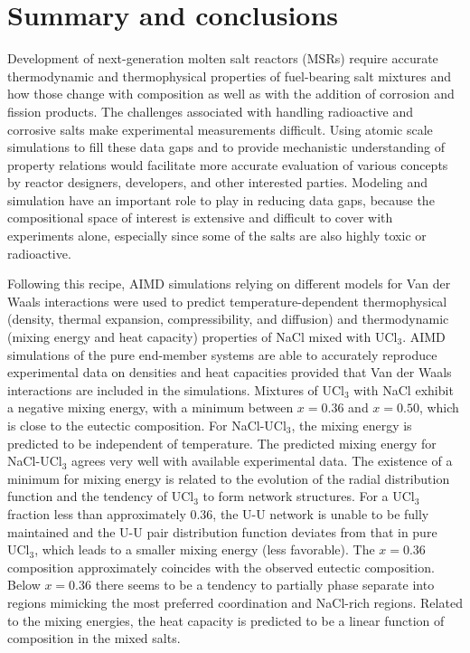 \documentclass[preprint,3p,10pt,onecolumn,number,sort&compress]{elsarticle}
\begin{document}
{\FloatBarrier

\section{Summary and conclusions}
\label{sec:conclusions}
Development of next-generation molten salt reactors (MSRs) require accurate thermodynamic and thermophysical properties of fuel-bearing salt mixtures and how those change with composition as well as with the addition of corrosion and fission products. The challenges associated with handling radioactive and corrosive salts make experimental measurements difficult. Using atomic scale simulations to fill these data gaps and to provide mechanistic understanding of property relations would facilitate more accurate evaluation of various concepts by reactor designers, developers, and other interested parties. Modeling and simulation have an important role to play in reducing data gaps, because the compositional space of interest is extensive and difficult to cover with experiments alone, especially since some of the salts are also highly toxic or radioactive. 

Following this recipe, AIMD simulations relying on different models for Van der Waals interactions were used to predict temperature-dependent thermophysical (density, thermal expansion, compressibility, and diffusion) and thermodynamic (mixing energy and heat capacity) properties of NaCl mixed with UCl$_3$. AIMD simulations of the pure end-member systems are able to accurately reproduce experimental data on densities and heat capacities provided that Van der Waals interactions are included in the simulations. %
Mixtures of UCl$_3$ with NaCl exhibit a negative mixing energy, with a minimum between $x=0.36$ and $x=0.50$, which is close to the eutectic composition. 
For NaCl-UCl$_3$, the mixing energy is predicted to be independent of temperature. The predicted mixing energy for NaCl-UCl$_3$ agrees very well with available experimental data. 
The existence of a minimum for mixing energy is related to the evolution of the radial distribution function and the tendency of UCl$_3$ to form network structures.
For a UCl$_3$ fraction less than approximately 0.36, the U-U network is unable to be fully maintained and the U-U pair distribution function deviates from that in pure UCl$_3$, which leads to a smaller mixing energy (less favorable). The $x=0.36$ composition approximately coincides with the observed eutectic composition. Below $x=0.36$ there seems to be a tendency to partially phase separate into regions mimicking the most preferred coordination and NaCl-rich regions. Related to the mixing energies, the heat capacity is predicted to be a linear function of composition in the mixed salts.

}
\end{document}
